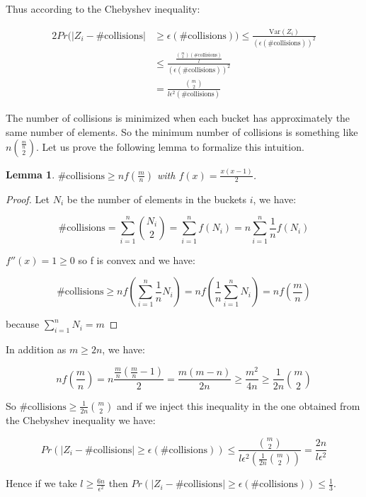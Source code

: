 \documentclass[10pt,a4paper]{article}
\theoremstyle{plain}
\newtheorem{lemma}{Lemma}
\begin{document}
Thus according to the Chebyshev inequality:

\begin{alignat*}{2}
Pr(|Z_i - \text{\# collisions}| & \geq \epsilon (\text{\# collisions})) \leq \frac{\text{Var}(Z_i)}{(\epsilon (\text{\# collisions}))^2} \\
& \leq \frac{\frac{{m \choose 2} (\text{\# collisions})}{l}}{(\epsilon (\text{\# collisions}))^2} \\
& =  \frac{{m \choose 2}}{l \epsilon^2 (\text{\# collisions})}
\end{alignat*}

The number of collisions is minimized when each bucket has approximately the same number of elements. So the minimum number of collisions is something like $n{\frac{m}{n} \choose 2}$. Let us prove the following lemma to formalize this intuition.

\begin{lemma}
$\text{\# collisions} \geq nf(\frac{m}{n})$ with $f(x) = \frac{x(x-1)}{2}$.
\end{lemma}

\begin{proof}
Let $N_i$ be the number of elements in the buckets $i$, we have:

$$
\text{\# collisions} = \sum_{i = 1}^n{{N_i \choose 2}} = \sum_{i = 1}^n{f(N_i)} = n\sum_{i = 1}^n{\frac{1}{n}f(N_i)}
$$

$f''(x) = 1 \geq 0$ so f is convex and we have:

$$
\text{\# collisions} \geq n f(\sum_{i = 1}^n{\frac{1}{n}N_i}) = n f(\frac{1}{n}\sum_{i = 1}^n{N_i}) = n f(\frac{m}{n})
$$

because $\sum_{i = 1}^n{N_i} = m$
\end{proof}

In addition as $m \geq 2n$, we have:

$$
nf(\frac{m}{n}) = n\frac{\frac{m}{n}(\frac{m}{n}-1)}{2} = \frac{m(m-n)}{2n} \geq \frac{m^2}{4n} \geq \frac{1}{2n}{m \choose 2}
$$

So $\text{\# collisions} \geq \frac{1}{2n}{m \choose 2}$ and if we inject this inequality in the one obtained from the Chebyshev inequality we have:

$$
Pr(|Z_i - \text{\# collisions}| \geq \epsilon (\text{\# collisions})) \leq \frac{{m \choose 2}}{l \epsilon^2 (\frac{1}{2n}{m \choose 2})} = \frac{2n}{l \epsilon^2}
$$

Hence if we take $l \geq \frac{6n}{\epsilon^2}$ then $Pr(|Z_i - \text{\# collisions}| \geq \epsilon (\text{\# collisions})) \leq \frac{1}{3}$.
\end{document}
